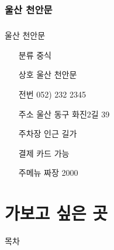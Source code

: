 \documentclass[aspectratio=1610,17pt,xcolor=pdftex,dvipsnames,table,handout]{beamer}
\begin{document}
		\section{ 울산 천안문 }
		\begin{frame} [t,plain]
		\frametitle{ }
			\begin{block} { 울산 천안문 }
			\setlength{\leftmargini}{4em}			
			\begin{itemize}
				\item [분류] 중식
				\item [상호] 울산 천안문
				\item [전번] 052) 232 2345
				\item [주소] 울산 동구 화진2길 39
				\item [주차장]  인근 길가
				\item [결제] 카드 가능
				\item [주메뉴] 짜장 2000
			\end{itemize}
			\end{block}						

		\end{frame}						




		\part{ 가보고 싶은  곳 }
		\frame{\partpage}
		
\label{part5} 	%

		\begin{frame} [plain]{목차}
		\tableofcontents%
		\end{frame}




\end{document}
